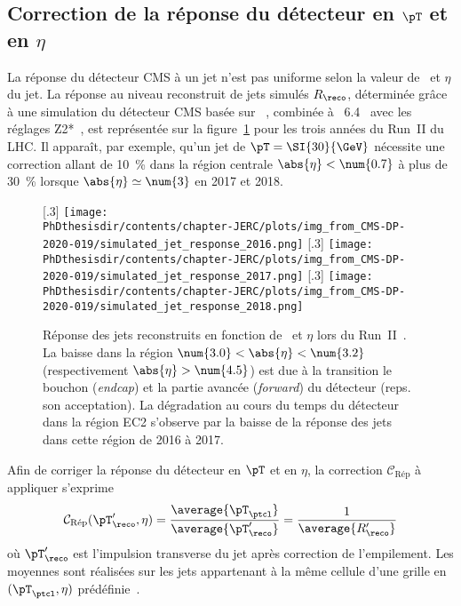 \subsection{Correction de la réponse du détecteur en $\pT$ et en $\eta$}\label{chapter-JERC-section-CMS-subsec-reponse}
La réponse du détecteur CMS à un jet n'est pas uniforme selon la valeur de \pT\ et $\eta$ du jet.
La réponse au niveau reconstruit de jets simulés $R_\reco$,
déterminée grâce à une simulation du détecteur CMS basée sur \GEANTfour~\cite{geant4},
combinée à \PYTHIA~6.4~\cite{pythia6.4}
avec les réglages Z2*~\cite{tunes_2016},
est représentée sur la figure~\ref{fig-simulated_jet_response_RunII} pour les trois années du Run~II du LHC.
Il apparaît, par exemple, qu'un jet de $\pT=\SI{30}{\GeV}$ nécessite une correction allant de \SI{10}{\%} dans la région centrale $\abs{\eta}<\num{0.7}$ à plus de \SI{30}{\%} lorsque $\abs{\eta}\simeq\num{3}$ en 2017 et 2018.
\begin{figure}[h]
\centering
{}[.3\textwidth]
{\texttt{[image: \\PhDthesisdir/contents/chapter-JERC/plots/img\_from\_CMS-DP-2020-019/simulated\_jet\_response\_2016.png]}}
\hfill
{}[.3\textwidth]
{\texttt{[image: \\PhDthesisdir/contents/chapter-JERC/plots/img\_from\_CMS-DP-2020-019/simulated\_jet\_response\_2017.png]}}
\hfill
{}[.3\textwidth]
{\texttt{[image: \\PhDthesisdir/contents/chapter-JERC/plots/img\_from\_CMS-DP-2020-019/simulated\_jet\_response\_2018.png]}}
\caption[Réponse des jets reconstruits en fonction de \pT\ et $\eta$ lors du Run~II.]{Réponse des jets reconstruits en fonction de \pT\ et $\eta$ lors du Run~II~\cite{CMS-DP-2020-019}. La baisse dans la région $\num{3.0}<\abs{\eta}<\num{3.2}$ (respectivement $\abs{\eta}>\num{4.5}$) est due à la transition le bouchon (\emph{endcap}) et la partie avancée (\emph{forward}) du détecteur (reps. son acceptation). La dégradation au cours du temps du détecteur dans la région \og EC2 \fg{} s'observe par la baisse de la réponse des jets dans cette région de 2016 à 2017.}
\label{fig-simulated_jet_response_RunII}
\end{figure}
\par Afin de corriger la réponse du détecteur en $\pT$ et en $\eta$, la correction $\mathcal{C}_\text{Rép}$ à appliquer s'exprime
\begin{equation}
\mathcal{C}_\text{Rép}(\pT_\reco', \eta) = \frac{\average{\pT_\ptcl}}{\average{\pT_\reco'}} = \frac{1}{\average{R_\reco'}}
\end{equation}
où $\pT_\reco'$ est l'impulsion transverse du jet après correction de l'empilement.
Les moyennes sont réalisées sur les jets appartenant à la même cellule d'une grille en $(\pT_\ptcl, \eta)$ prédéfinie~\cite{JERC_RunI}.
